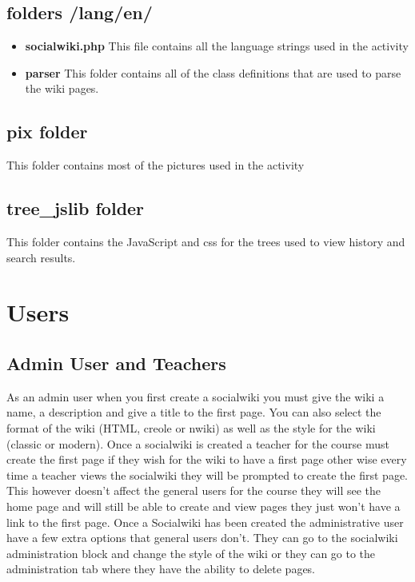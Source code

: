 \documentclass[letterpaper,twoside,11pt]{article}
\begin{document}
	\subsection{folders /lang/en/}
\begin{itemize}
	\item \textbf{socialwiki.php}
	This file contains all the language strings used in the activity
	\item \textbf{parser}
	This folder contains all of the class definitions that are used to parse the wiki pages.
\end{itemize}
\subsection{pix folder}
	This folder contains most of the pictures used in the activity
	\subsection{tree\_jslib folder}
	This folder contains the JavaScript and css for the trees used to view history and search results.
	
	
	\section{Users}
	\subsection{Admin User and Teachers}
	As an admin user when you first create a socialwiki you must give the wiki a name, a description and give a title to the first page. You can also select the format of the wiki (HTML, creole or nwiki) as well as the style for the wiki (classic or modern). Once a socialwiki is created a teacher for the course must create the first page if they wish for the wiki to have a first page other wise every time a teacher views the socialwiki they will be prompted to create the first page. This however doesn't affect the general users for the course they will see the home page and will still be able to create and view pages they just won't have a link to the first page. 
	Once a Socialwiki has been created the administrative user have a few extra options that general users don't. They can go to the socialwiki administration block and change the style of the wiki or they can go to the administration tab where they have the ability to delete pages.
\end{document}
